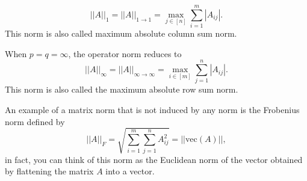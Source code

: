 \documentclass[10pt,a4paper]{article}
\begin{document}
\begin{equation*}
	||A||_1 = ||A||_{1\to1} = \max_{j\in[n]} \sum_{i=1}^{m} |A_{ij}|.
\end{equation*}
This norm is also called maximum absolute column sum norm.
\par When $p=q=\infty$, the operator norm reduces to 
\begin{equation*}
	||A||_\infty = ||A||_{\infty\to\infty} = \max_{i\in[m]} \sum_{j=1}^{n} |A_{ij}|.
\end{equation*}
This norm is also called the maximum absolute row sum norm.
\par An example of a matrix norm that is not induced by any norm is the Frobenius norm defined by
\begin{equation*}
	||A||_F = \sqrt{\sum_{i=1}^{m} \sum_{j=1}^{n} A^2_{ij}} = ||\text{vec}(A)||,
\end{equation*}
in fact, you can think of this norm as the Euclidean norm of the vector obtained by flattening the matrix $A$ into a vector.
\end{document}

